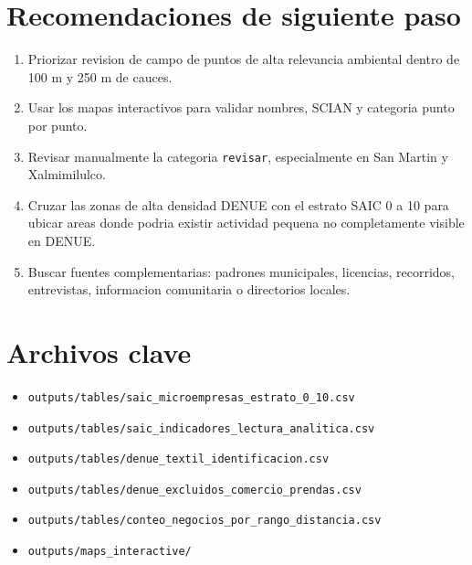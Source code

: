 \documentclass[11pt,letterpaper]{article}
\begin{document}
\section{Recomendaciones de siguiente paso}

\begin{enumerate}
  \item Priorizar revision de campo de puntos de alta relevancia ambiental dentro de 100 m y 250 m de cauces.
  \item Usar los mapas interactivos para validar nombres, SCIAN y categoria punto por punto.
  \item Revisar manualmente la categoria \texttt{revisar}, especialmente en San Martin y Xalmimilulco.
  \item Cruzar las zonas de alta densidad DENUE con el estrato SAIC 0 a 10 para ubicar areas donde podria existir actividad pequena no completamente visible en DENUE.
  \item Buscar fuentes complementarias: padrones municipales, licencias, recorridos, entrevistas, informacion comunitaria o directorios locales.
\end{enumerate}

\section{Archivos clave}

\begin{itemize}
  \item \texttt{outputs/tables/saic\_microempresas\_estrato\_0\_10.csv}
  \item \texttt{outputs/tables/saic\_indicadores\_lectura\_analitica.csv}
  \item \texttt{outputs/tables/denue\_textil\_identificacion.csv}
  \item \texttt{outputs/tables/denue\_excluidos\_comercio\_prendas.csv}
  \item \texttt{outputs/tables/conteo\_negocios\_por\_rango\_distancia.csv}
  \item \texttt{outputs/maps\_interactive/}
\end{itemize}
\end{document}
